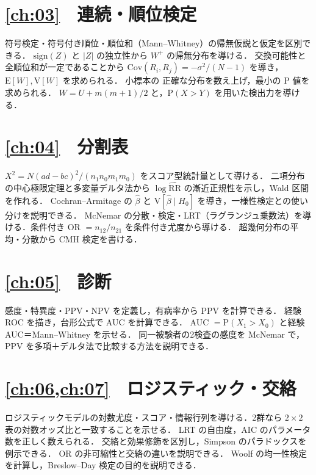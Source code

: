 \documentclass[a4paper,11pt,openany]{ltjsbook}
\newcommand{\E}{\mathrm{E}}
\newcommand{\V}{\mathrm{V}}
\newcommand{\Cov}{\mathrm{Cov}}
\newcommand{\Prob}{\mathrm{P}}
\newcommand{\RR}{\mathrm{RR}}
\begin{document}
\section*{\cref{ch:03}　連続・順位検定}
\begin{itemize}
\chk 符号検定・符号付き順位・順位和（Mann--Whitney）の帰無仮説と仮定を区別できる．
\chk $\mathrm{sign}(Z)$ と $|Z|$ の独立性から $W^+$ の帰無分布を導ける．
\chk 交換可能性と全順位和が一定であることから $\Cov(R_i,R_j)=-\sigma^2/(N-1)$ を導き，$\E[W],\V[W]$ を求められる．
\chk 小標本の 正確な分布を数え上げ，最小の P 値を求められる．
\chk $W=U+m(m+1)/2$ と，$\Prob(X>Y)$ を用いた検出力を導ける．
\end{itemize}
\section*{\cref{ch:04}　分割表}
\begin{itemize}
\chk $X^2=N(ad-bc)^2/(n_1n_0m_1m_0)$ をスコア型統計量として導ける．
\chk 二項分布の中心極限定理と多変量デルタ法から $\log\widehat{\RR}$ の漸近正規性を示し，Wald 区間を作れる．
\chk Cochran--Armitage の $\hat\beta$ と $\V[\hat\beta\mid H_0]$ を導き，一様性検定との使い分けを説明できる．
\chk McNemar の分散・検定・LRT（ラグランジュ乗数法）を導ける．条件付き OR $=n_{12}/n_{21}$ を条件付き尤度から導ける．
\chk 超幾何分布の平均・分散から CMH 検定を書ける．
\end{itemize}
\section*{\cref{ch:05}　診断}
\begin{itemize}
\chk 感度・特異度・PPV・NPV を定義し，有病率から PPV を計算できる．
\chk 経験 ROC を描き，台形公式で AUC を計算できる．
\chk AUC $=\Prob(X_1>X_0)$ と経験 AUC＝Mann--Whitney を示せる．
\chk 同一被験者の2検査の感度を McNemar で，PPV を多項＋デルタ法で比較する方法を説明できる．
\end{itemize}
\section*{\cref{ch:06,ch:07}　ロジスティック・交絡}
\begin{itemize}
\chk ロジスティックモデルの対数尤度・スコア・情報行列を導ける．2群なら $2\times2$ 表の対数オッズ比と一致することを示せる．
\chk LRT の自由度，AIC のパラメータ数を正しく数えられる．
\chk 交絡と効果修飾を区別し，Simpson のパラドックスを例示できる．
\chk OR の非可縮性と交絡の違いを説明できる．
\chk Woolf の均一性検定を計算し，Breslow--Day 検定の目的を説明できる．
\end{itemize}
\end{document}
